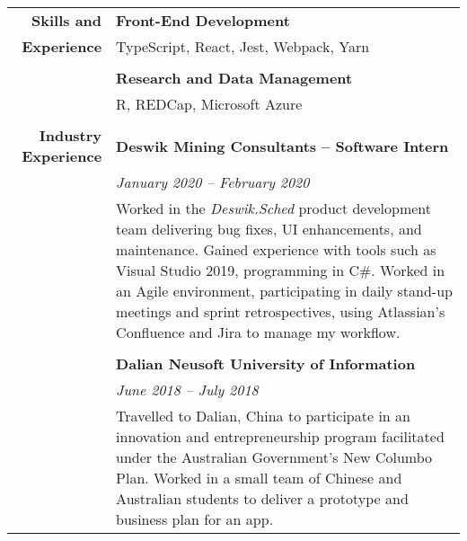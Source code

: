 \documentclass[a4paper]{article}
\begin{document}
\begin{longtable}{r p{13.5cm}}
	\textbf{Skills and}					\vline & \textbf{Front-End Development} \\
	\textbf{Experience}					\vline & TypeScript, React, Jest, Webpack, Yarn \\
										\vline & \\
										\vline & \textbf{Research and Data Management} \\
										\vline & R, REDCap, Microsoft Azure \\
										\vline & \\

\textbf{Industry Experience} 	  		\vline & \textbf{Deswik Mining Consultants – Software Intern} \\
										\vline & \textit{January 2020 – February 2020} \\
										\vline & Worked in the \textit{Deswik.Sched} product development team delivering bug fixes, UI enhancements, and maintenance. Gained experience with tools such as Visual Studio 2019, programming in C\#. Worked in an Agile environment, participating in daily stand-up meetings and sprint retrospectives, using Atlassian’s Confluence and Jira to manage my workflow. \\ 
										\vline & \\

										\vline & \textbf{Dalian Neusoft University of Information} \\
										\vline & \textit{June 2018 – July 2018} \\
										\vline & Travelled to Dalian, China to participate in an innovation and entrepreneurship program facilitated under the Australian Government’s New Columbo Plan. Worked in a small team of Chinese and Australian students to deliver a prototype and business plan for an app. \\
							     
	\end{longtable}
\end{document}
